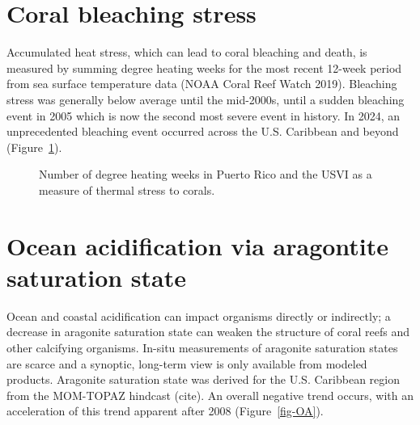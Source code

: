 \documentclass[
  letterpaper,
  oneside,
  open=any]{scrbook}
\begin{document}
\section{Coral bleaching stress}\label{coral-bleaching-stress}

Accumulated heat stress, which can lead to coral bleaching and death, is
measured by summing degree heating weeks for the most recent 12-week
period from sea surface temperature data (NOAA Coral Reef Watch 2019).
Bleaching stress was generally below average until the mid-2000s, until
a sudden bleaching event in 2005 which is now the second most severe
event in history. In 2024, an unprecedented bleaching event occurred
across the U.S. Caribbean and beyond (Figure~\ref{fig-DHW}).

\begin{figure}


\caption{\label{fig-DHW}Number of degree heating weeks in Puerto Rico
and the USVI as a measure of thermal stress to corals.}

\end{figure}%

\section{Ocean acidification via aragontite saturation
state}\label{ocean-acidification-via-aragontite-saturation-state}

Ocean and coastal acidification can impact organisms directly or
indirectly; a decrease in aragonite saturation state can weaken the
structure of coral reefs and other calcifying organisms. In-situ
measurements of aragonite saturation states are scarce and a synoptic,
long-term view is only available from modeled products. Aragonite
saturation state was derived for the U.S. Caribbean region from the
MOM-TOPAZ hindcast (cite). An overall negative trend occurs, with an
acceleration of this trend apparent after 2008 (Figure~\ref{fig-OA}).
\end{document}
